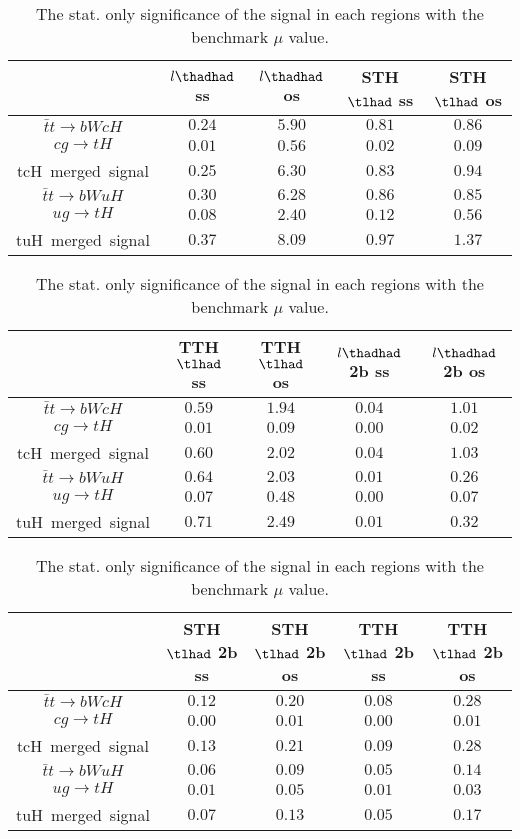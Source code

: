 \begin{table}
\footnotesize
\caption{The stat. only significance of the signal in each regions with the benchmark $\mu$ value.}
\centering
\begin{tabular}{|c|c|c|c|c|} \hline
 & $l\thadhad$ ss & $l\thadhad$ os & STH $\tlhad$ ss & STH $\tlhad$ os\\\hline
$\bar{t}t\to bWcH$ & $0.24$ & $5.90$ & $0.81$ & $0.86$\\\hline
$cg\to tH$ & $0.01$ & $0.56$ & $0.02$ & $0.09$\\\hline
tcH~merged~signal & $0.25$ & $6.30$ & $0.83$ & $0.94$\\\hline
$\bar{t}t\to bWuH$ & $0.30$ & $6.28$ & $0.86$ & $0.85$\\\hline
$ug\to tH$ & $0.08$ & $2.40$ & $0.12$ & $0.56$\\\hline
tuH~merged~signal & $0.37$ & $8.09$ & $0.97$ & $1.37$\\\hline
\end{tabular}
\begin{tabular}{|c|c|c|c|c|} \hline
 & TTH $\tlhad$ ss & TTH $\tlhad$ os & $l\thadhad$ 2b ss & $l\thadhad$ 2b os\\\hline
$\bar{t}t\to bWcH$ & $0.59$ & $1.94$ & $0.04$ & $1.01$\\\hline
$cg\to tH$ & $0.01$ & $0.09$ & $0.00$ & $0.02$\\\hline
tcH~merged~signal & $0.60$ & $2.02$ & $0.04$ & $1.03$\\\hline
$\bar{t}t\to bWuH$ & $0.64$ & $2.03$ & $0.01$ & $0.26$\\\hline
$ug\to tH$ & $0.07$ & $0.48$ & $0.00$ & $0.07$\\\hline
tuH~merged~signal & $0.71$ & $2.49$ & $0.01$ & $0.32$\\\hline
\end{tabular}
\begin{tabular}{|c|c|c|c|c|} \hline
 & STH $\tlhad$ 2b ss & STH $\tlhad$ 2b os & TTH $\tlhad$ 2b ss & TTH $\tlhad$ 2b os\\\hline
$\bar{t}t\to bWcH$ & $0.12$ & $0.20$ & $0.08$ & $0.28$\\\hline
$cg\to tH$ & $0.00$ & $0.01$ & $0.00$ & $0.01$\\\hline
tcH~merged~signal & $0.13$ & $0.21$ & $0.09$ & $0.28$\\\hline
$\bar{t}t\to bWuH$ & $0.06$ & $0.09$ & $0.05$ & $0.14$\\\hline
$ug\to tH$ & $0.01$ & $0.05$ & $0.01$ & $0.03$\\\hline
tuH~merged~signal & $0.07$ & $0.13$ & $0.05$ & $0.17$\\\hline
\end{tabular}
\label{tab:significance}
\end{table}
